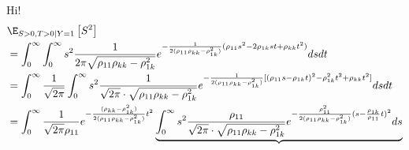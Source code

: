 \documentclass{article}
\begin{document}
\newpage
Hi!
\newpage
\begin{align}
  &\E_{S > 0, T > 0 \mid Y=1} \left[ S^2 \right] \\
  &= \int_0^\infty \int_0^\infty s^2 \frac{1}{2\pi \sqrt{\rho_{11} \rho_{kk} - \rho_{1k}^2}} e^{-\frac{1}{2 (\rho_{11} \rho_{kk} - \rho_{1k}^2)}( \rho_{11} s^2 - 2 \rho_{1k} st + \rho_{kk} t^2 )} ds dt \\
  &= \int_0^\infty \frac{1}{\sqrt{2\pi}} \int_0^\infty s^2 \frac{1}{\sqrt{2\pi} \cdot \sqrt{\rho_{11} \rho_{kk} - \rho_{1k}^2}} e^{-\frac{1}{2 (\rho_{11} \rho_{kk} - \rho_{1k}^2)}[ ( \rho_{11} s - \rho_{1k} t )^2 - \rho_{1k}^2 t^2 + \rho_{kk} t^2 ]} ds dt \\
  &= \int_0^\infty \frac{1}{\sqrt{2\pi} \rho_{11}} e^{-\frac{(\rho_{kk} - \rho_{1k}^2) }{2 (\rho_{11} \rho_{kk} - \rho_{1k}^2)} t^2 } \underbrace{ \int_0^\infty s^2 \frac{\rho_{11}}{\sqrt{2\pi} \cdot \sqrt{\rho_{11} \rho_{kk} - \rho_{1k}^2}} e^{-\frac{\rho_{11}^2}{2 (\rho_{11} \rho_{kk} - \rho_{1k}^2)} ( s - \frac{\rho_{1k}}{\rho_{11}} t )^2 } ds }%
\end{align}
\end{document}
